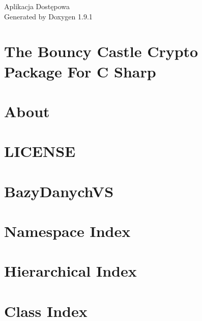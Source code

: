 \let\mypdfximage\pdfximage\def\pdfximage{\immediate\mypdfximage}\documentclass[twoside]{book}
\newcommand{\+}{\discretionary{\mbox{\scriptsize$\hookleftarrow$}}{}{}}
\newcommand{\clearemptydoublepage}{%
  \newpage{\pagestyle{empty}\cleardoublepage}%
}
\begin{document}
\raggedbottom

\begin{titlepage}
\vspace*{7cm}
\begin{center}%
{\Large Aplikacja Dostępowa }\\
\vspace*{1cm}
{\large Generated by Doxygen 1.9.1}\\
\end{center}
\end{titlepage}
\clearemptydoublepage
{}
\tableofcontents
\clearemptydoublepage
{}

\chapter{The Bouncy Castle Crypto Package For C Sharp}
\label{md__g__sem6__b_a_z_y_packages__bouncy_castle_1_8_9__r_e_a_d_m_e}

\chapter{About}
\label{md__g__sem6__b_a_z_y_packages__my_sql_connector_1_3_8__r_e_a_d_m_e}

\chapter{LICENSE}
\label{md__g__sem6__b_a_z_y_packages__newtonsoft__json_13_0_1__l_i_c_e_n_s_e}

\chapter{Bazy\+Danych\+VS}
\label{md__g__sem6__b_a_z_y__r_e_a_d_m_e}

\chapter{Namespace Index}

\chapter{Hierarchical Index}

\chapter{Class Index}

\end{document}
